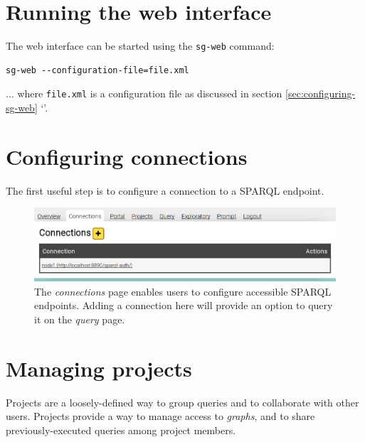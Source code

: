 \section{Running the web interface}

  The web interface can be started using the \texttt{sg-web} command:

\begin{siderules}
\begin{verbatim}
sg-web --configuration-file=file.xml
\end{verbatim}
\end{siderules}

  $\ldots{}$ where \texttt{file.xml} is a configuration file as
  discussed in section \ref{sec:configuring-sg-web}
  {\color{LinkGray}`'}.

\section{Configuring connections}
\label{sec:configure-connections}

  The first useful step is to configure a connection to a SPARQL endpoint.

  \begin{figure}[h]
    \begin{center}
      \includegraphics[width=1.0\textwidth]{figures/web-connections.png}
    \end{center}
    \caption{The \emph{connections} page enables users to configure accessible
      SPARQL endpoints.  Adding a connection here will provide an option to
      query it on the \emph{query} page.}
    \label{fig:web-connections}
  \end{figure}

\section{Managing projects}
\label{sec:web-projects}

  Projects are a loosely-defined way to group queries and to collaborate with
  other users.  Projects provide a way to manage access to \emph{graphs}, and
  to share previously-executed queries among project members.

